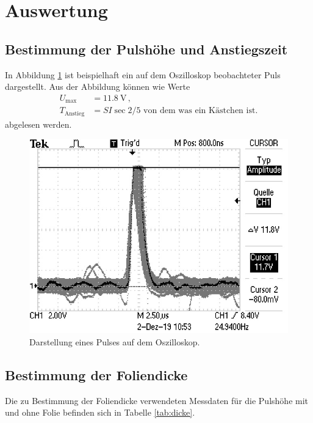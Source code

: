 \section{Auswertung}
\label{sec:Auswertung}

\subsection{Bestimmung der Pulshöhe und Anstiegszeit}
\label{subsec:puls}

In Abbildung \ref{fig:puls} ist beispielhaft ein auf dem Oszilloskop beobachteter Puls
dargestellt. Aus der Abbildung können wie Werte
\begin{align*}
  U_\text{max}&= \SI{11.8}{\volt}\,,\\
  T_\text{Anstieg}&= SI{}{\sec} \text{2/5 von dem was ein Kästchen ist.}
\end{align*}
abgelesen werden.

\begin{figure}
  \centering
  \includegraphics[width=\textwidth]{images/peak.JPG}
  \caption{Darstellung eines Pulses auf dem Oszilloskop.}
  \label{fig:puls}
\end{figure}

\subsection{Bestimmung der Foliendicke}
\label{subsec:dicke}

Die zu Bestimmung der Foliendicke verwendeten Messdaten für die Pulshöhe
mit und ohne Folie befinden sich in Tabelle \ref{tab:dicke}.

